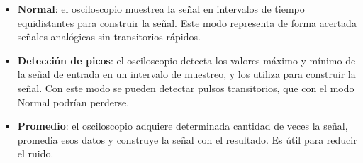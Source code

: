   \begin{itemize}
    \item \textbf{Normal}: el osciloscopio muestrea la señal en intervalos de tiempo equidistantes para construir la señal. Este
      modo representa de forma acertada señales analógicas sin transitorios rápidos.
    \item \textbf{Detección de picos}: el osciloscopio detecta los valores máximo y mínimo de la señal de entrada en un intervalo
      de muestreo, y los utiliza para construir la señal. Con este modo se pueden detectar pulsos transitorios, que con el
      modo Normal podrían perderse.
    \item \textbf{Promedio}: el osciloscopio adquiere determinada cantidad de veces la señal, promedia esos datos y construye la
      señal con el resultado. Es útil para reducir el ruido.
  \end{itemize}

